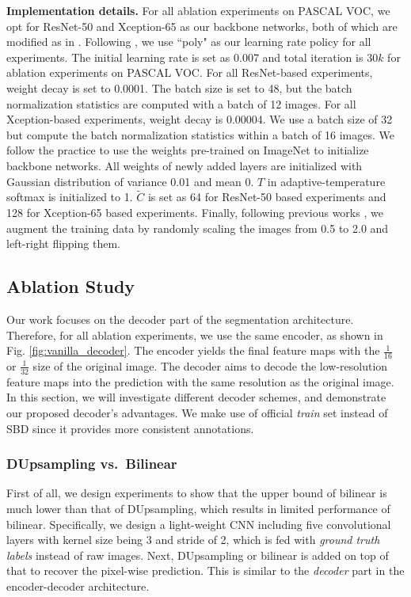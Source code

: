 \documentclass[10pt,twocolumn,letterpaper]{article}
\newcommand{\1}{{\mathbbm{1}}}
\begin{document}
\textbf{Implementation details.} For all ablation experiments on PASCAL VOC, we opt for ResNet-50 \cite{he2016deep} and Xception-65 \cite{chollet2017xception} as our backbone networks, both of which are modified as in \cite{chen2018encoder}. Following \cite{liu2015parsenet, chen2017rethinking, chen2018encoder}, we use ``poly" as our learning rate policy for all experiments. The initial learning rate is set as 0.007 and total iteration is $30k$ for ablation experiments on PASCAL VOC. For all ResNet-based experiments, weight decay is set to 0.0001. The batch size is set to 48, but the batch normalization \cite{ioffe2015batch} statistics are computed with a batch of 12 images. For all Xception-based experiments, weight decay is 0.00004.
We use a batch size of 32 but compute the batch normalization statistics within a batch of 16 images. We follow the  practice \cite{chen2018encoder, chen2017rethinking, zhang2019deep} to use the weights pre-trained on ImageNet \cite{deng2009imagenet} to initialize backbone networks. All weights of newly added layers are initialized with Gaussian distribution of variance 0.01 and mean 0. $T$ in adaptive-temperature softmax is initialized to 1. $\tilde{C}$ is set as 64 for ResNet-50 based experiments and 128 for Xception-65 based experiments. Finally, following previous works \cite{chen2017rethinking, chen2018deeplab, chen2018encoder}, we augment the training data by randomly scaling the images from 0.5 to 2.0 and left-right flipping them.

\subsection{Ablation Study}
Our work focuses on the decoder part of the segmentation architecture. Therefore, for all ablation experiments, we use the same encoder, as shown in Fig. \ref{fig:vanilla_decoder}. The encoder yields the final feature maps with the $\frac{1}{ 16}$ or $\frac{1}{32}$ size of the original image. The decoder aims to decode the low-resolution feature maps into the prediction with the same resolution as the original image. In this section, we will investigate different decoder schemes, and demonstrate our proposed decoder's advantages. We make use of official {\it train} set instead of SBD \cite{hariharan2011semantic} since it provides more consistent annotations.

\subsubsection{DUpsampling vs.\  Bilinear} \label{section:dupsampling_vs_bilinear}
First of all, we design experiments to show that the upper bound of bilinear is much lower than that of DUpsampling, which results in limited performance of bilinear. Specifically, we design a light-weight CNN including five convolutional layers with kernel size being 3 and stride of 2, which is fed  with {\em ground truth labels} instead of raw images. Next, DUpsampling or bilinear is added on top of that to recover the pixel-wise prediction.
This is similar to the {\em decoder} part in the encoder-decoder architecture.
\end{document}
